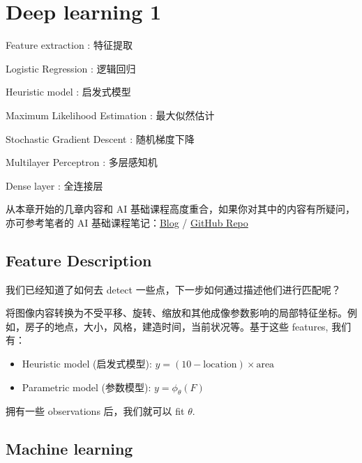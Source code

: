 \chapter{Deep learning 1}
\begin{introduction}[keywords]
    \item Feature extraction : 特征提取
    \item Logistic Regression : 逻辑回归
    \item Heuristic model : 启发式模型
    \item Maximum Likelihood Estimation : 最大似然估计
    \item Stochastic Gradient Descent : 随机梯度下降
    \item Multilayer Perceptron : 多层感知机
    \item Dense layer : 全连接层
\end{introduction}

\begin{note}
    从本章开始的几章内容和 AI 基础课程高度重合，如果你对其中的内容有所疑问，亦可参考笔者的 AI 基础课程笔记：\href{https://arthals.ink/tags/ai\%20\%E5\%9F\%BA\%E7\%A1\%80}{Blog} / \href{https://github.com/zhuozhiyongde/Fundamentals-of-Artificial-Intelligence-2024Spring-PKU/tree/main/Note}{GitHub Repo}
\end{note}

\section{Feature Description}

\begin{problem}
    我们已经知道了如何去 detect 一些点，下一步如何通过描述他们进行匹配呢？
\end{problem}

    将图像内容转换为不受平移、旋转、缩放和其他成像参数影响的局部特征坐标。例如，房子的地点，大小，风格，建造时间，当前状况等。基于这些 features, 我们有：
    \begin{itemize}
        \item Heuristic model (启发式模型): $y = (10-\text{location})\times \text{area}$
        \item Parametric model (参数模型): $y = \phi_\theta(F)$
    \end{itemize}
\begin{note}
拥有一些 observations 后，我们就可以 fit $\theta$.
\end{note}

\section{Machine learning}

